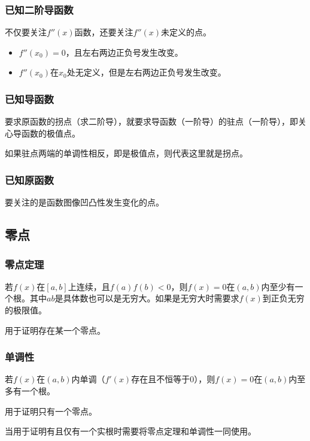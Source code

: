 \documentclass[UTF8, 12pt]{ctexart}
\begin{document}
\subsubsection{已知二阶导函数}

不仅要关注$f''(x)$函数，还要关注$f''(x)$未定义的点。

\begin{itemize}
    \item $f''(x_0)=0$，且左右两边正负号发生改变。
    \item $f''(x_0)$在$x_0$处无定义，但是左右两边正负号发生改变。
\end{itemize}

\subsubsection{已知导函数}

要求原函数的拐点（求二阶导），就要求导函数（一阶导）的驻点（一阶导），即关心导函数的极值点。

如果驻点两端的单调性相反，即是极值点，则代表这里就是拐点。

\subsubsection{已知原函数}

要关注的是函数图像凹凸性发生变化的点。

\subsection{零点}

\subsubsection{零点定理}

若$f(x)$在$[a,b]$上连续，且$f(a)f(b)<0$，则$f(x)=0$在$(a,b)$内至少有一个根。其中$ab$是具体数也可以是无穷大。如果是无穷大时需要求$f(x)$到正负无穷的极限值。

用于证明存在某一个零点。

\subsubsection{单调性}

若$f(x)$在$(a,b)$内单调（$f'(x)$存在且不恒等于0），则$f(x)=0$在$(a,b)$内至多有一个根。

用于证明只有一个零点。

当用于证明有且仅有一个实根时需要将零点定理和单调性一同使用。
\end{document}
